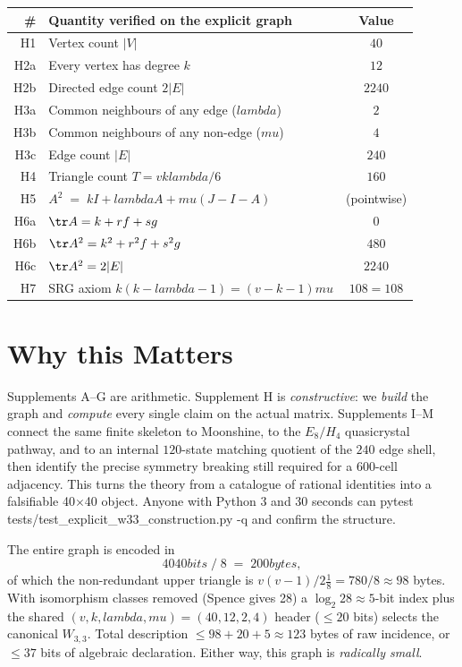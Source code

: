 \documentclass[12pt,a4paper]{article}
\def\texttt#1{#1}%
\def\text#1{#1}%
\def\lambda{lambda}%
\def\mu{mu}%
\def\cdot{ }%
\theoremstyle{definition}
\begin{document}
\begin{longtable}{rlc}
\toprule
\# & Quantity verified on the explicit graph & Value \\
\midrule \endhead
H1 & Vertex count $|V|$ & $40$ \\
H2a & Every vertex has degree $k$ & $12$ \\
H2b & Directed edge count $2|E|$ & $2\cdot 240$ \\
H3a & Common neighbours of any edge ($\lambda$) & $2$ \\
H3b & Common neighbours of any non-edge ($\mu$) & $4$ \\
H3c & Edge count $|E|$ & $240$ \\
H4 & Triangle count $T=vk\lambda/6$ & $160$ \\
H5 & $A^2 \;=\; kI + \lambda A + \mu(J-I-A)$ & (pointwise) \\
H6a & $\tr A = k+rf+sg$ & $0$ \\
H6b & $\tr A^2 = k^2+r^2f+s^2g$ & $480$ \\
H6c & $\tr A^2 = 2|E|$ & $2\cdot 240$ \\
H7 & SRG axiom $k(k-\lambda-1)=(v-k-1)\mu$ & $108=108$ \\
\bottomrule
\end{longtable}

\section*{Why this Matters}

Supplements A--G are arithmetic. Supplement H is
\emph{constructive}: we \emph{build} the graph and \emph{compute} every
single claim on the actual matrix. Supplements I--M connect the same
finite skeleton to Moonshine, to the $E_8/H_4$ quasicrystal pathway, and
to an internal $120$-state matching quotient of the $240$ edge shell,
then identify the precise symmetry breaking still required for a
$600$-cell adjacency.
This turns the theory from a catalogue of rational identities into a falsifiable
40$\times$40 object. Anyone with Python 3 and 30 seconds can
\texttt{pytest tests/test\_explicit\_w33\_construction.py -q} and
confirm the structure.

The entire graph is encoded in
\[
40 \cdot 40 \text{ bits} \;/\;8 \;=\; 200 \text{ bytes},
\]
of which the non-redundant upper triangle is $v(v-1)/2 \cdot \tfrac{1}{8}
= 780/8 \approx 98$ bytes. With isomorphism classes removed
(Spence gives 28) a $\log_2 28 \approx 5$-bit index plus the shared
$(v,k,\lambda,\mu)=(40,12,2,4)$ header ($\le 20$ bits) selects the
canonical $W_{3,3}$. Total description
$\le 98 + 20 + 5 \approx 123$ bytes of raw incidence, or
$\le 37$ bits of algebraic declaration. Either way, this graph is
\emph{radically small}.
\end{document}

